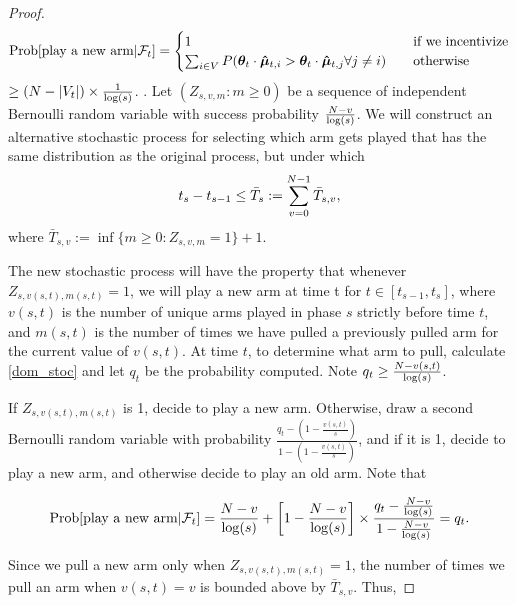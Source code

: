\begin{proof}
\[ \Prob{\text{play a new arm}|\mathcal{F}_t} =
\begin{cases}
1       & \quad \text{if we incentivize}\\
\sum_{i\in V} P(\AgentV{t} \cdot \ArmEV{t}{i}>\AgentV{t}\cdot \ArmEV{t}{j} \forall j\neq i)  & \quad \text{otherwise}  
\end{cases} \label{dom_stoc}
\] 
\hspace{1cm}$\geq (N-|V_t|)\times \frac{1}{\log(s)}$.
.
Let $(Z_{s,v,m}:m\geq 0)$ be a sequence of independent Bernoulli random variable with success probability $\frac{N-v}{\log(s)}$. We will construct an alternative stochastic process for selecting which arm gets played that has the same distribution as the original process, but under which
\begin{align}
t_{s}-t_{s-1}\leq \bar{T}_{s}:=\sum_{v=0}^{N-1}\bar{T}_{s,v}, \nonumber 
\end{align}
where $\bar{T}_{s,v}:=\inf\{m\geq 0: Z_{s,v,m}=1\}+1$.

The new stochastic process will have the property that whenever $Z_{s,v(s,t),m(s,t)}=1$, we will play a new arm at time t for $t\in [t_{s-1}, t_{s}]$, where $v(s,t)$ is the number of unique arms played in phase $s$ strictly before time $t$, and $m(s,t)$ is the number of times we have pulled a previously pulled arm for the current value of $v(s,t)$. At time $t$, to determine what arm to pull, calculate \eqref{dom_stoc} and let $q_t$ be the probability computed. Note $q_t\geq \frac{N-v(s,t)}{\log(s)}$.

If $Z_{s,v(s,t),m(s,t)}$ is 1, decide to play a new arm. Otherwise, draw a second Bernoulli random variable with probability $\frac{q_t-(1-\frac{v(s,t)}{s})}{1-(1-\frac{v(s,t)}{s})}$, and if it is 1, decide to play a new arm, and otherwise decide to play an old arm. Note that

\begin{align}
\Prob{\text{play a new arm}|\mathcal{F}_{t}}=\frac{\ARMNUM-v}{\log(s)}+\left[1-\frac{\ARMNUM-v}{\log(s)}\right]\times \frac{q_t-\frac{\ARMNUM-v}{\log(s)}}{1-\frac{\ARMNUM-v}{\log(s)}}=q_t.
\end{align}

Since we pull a new arm only when $Z_{s,v(s,t),m(s,t)}=1$, the number of times we pull an arm when $v(s,t)=v$ is bounded above by $\bar{T}_{s,v}$. Thus,


\end{proof}
